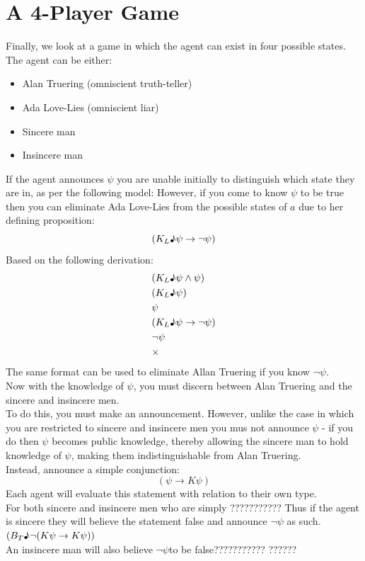 \documentclass[12pt, titlepage, twoside, a4paper]{report}
\begin{document}
\section{A 4-Player Game}
Finally, we look at a game in which the agent can exist in four possible states. The agent can be either:
\begin{itemize}
\item Alan Truering (omniscient truth-teller)
\item Ada Love-Lies (omniscient liar)
\item Sincere man
\item Insincere man
\end{itemize}
If the agent announces $\psi$ you are unable initially to distinguish which state they are in, as per the following model:
However, if you come to know $\psi$ to be true then you can eliminate Ada Love-Lies from the possible states of $a$ due to her defining proposition: 
$$(K_L \text{\textmusicalnote} \psi \to \neg \psi)$$
Based on the following derivation:
\begin{align*}
&(K_L \text{\textmusicalnote} \psi \wedge \psi )\\
&(K_L \text{\textmusicalnote} \psi )\\
&\psi \\
&(K_L \text{\textmusicalnote} \psi \to \neg \psi )\\
&\neg \psi \\
&\times
\end{align*}
The same format can be used to eliminate Allan Truering if you know $\neg \psi$.\\
Now with the knowledge of $\psi$, you must discern between Alan Truering and the sincere and insincere men.\\
To do this, you must make an announcement. However, unlike the case in which you are restricted to sincere and insincere men you mus not announce $\psi$ - if you do then $\psi$ becomes public knowledge, thereby allowing the sincere man to hold knowledge of $\psi$, making them indistinguishable from Alan Truering.\\
Instead, announce a simple conjunction:
$$(\psi \to K\psi)$$ 
Each agent will evaluate this statement with relation to their own type.\\
For both sincere and insincere men who are simply ???????????
Thus if the agent is sincere they will believe the statement false and announce $\neg \psi$ as such. 
$(B_T \text{\textmusicalnote} \neg (K \psi \to K \psi))$ \\
An insincere man will also believe $\neg \psi$to be false???????????
??????
\end{document}
